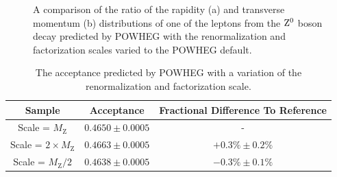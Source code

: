 \documentclass{cmspaper}
\begin{document}
\begin{figure}[htb]
  \begin{center}
    \caption{A comparison of the ratio of the rapidity (a) and transverse momentum (b) distributions of one of the leptons from the $\mathrm{Z^0}$ boson decay predicted by POWHEG with the renormalization and factorization scales varied to the POWHEG default.}
    \label{fig:PowhegScaleVariation_LeptonRapidityPt}
  \end{center}
\end{figure}


\begin{table}[!ht]
\begin{center}
\begin{tabular}{|c|c|c|}
\hline
Sample &  Acceptance & Fractional Difference To Reference \\
\hline   
Scale = $M_{\mathrm{Z}}$                   & $0.4650 \pm 0.0005$  &  - \\
Scale = $2\times M_{\mathrm{Z}}$           & $0.4663 \pm 0.0005$  & $ +0.3\% \pm 0.2\%$  \\
Scale = $M_{\mathrm{Z}} / 2$               & $0.4638 \pm 0.0005$  & $ -0.3\% \pm 0.1\%$  \\
\hline
\end{tabular}
\caption{The acceptance predicted by POWHEG with a variation of the renormalization and factorization scale. \label{tab:PowhegScaleVariation}}
\end{center}
\end{table}
\end{document}
